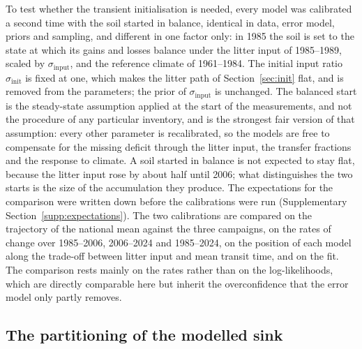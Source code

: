 \documentclass[11pt]{article}
\newcommand{\sinput}{\sigma_{\mathrm{input}}}
\newcommand{\sinit}{\sigma_{\mathrm{init}}}
\begin{document}
To test whether the transient initialisation is needed, every model was calibrated a second time
with the soil started in balance, identical in data, error model, priors and sampling, and
different in one factor only: in 1985 the soil is set to the state at which its gains and losses
balance under the litter input of 1985--1989, scaled by $\sinput$, and the reference climate of
1961--1984. The initial input ratio $\sinit$ is fixed at one, which makes the litter path of
Section~\ref{sec:init} flat, and is removed from the parameters; the prior of $\sinput$ is
unchanged. The balanced start is the steady-state assumption applied at the start of the
measurements, and not the procedure of any particular inventory, and is the strongest fair version
of that assumption: every other parameter is recalibrated, so the models are free to compensate for
the missing deficit through the litter input, the transfer fractions and the response to climate.
A soil started in balance is not expected to stay flat, because the litter input rose by about
half until 2006; what distinguishes the two starts is the size of the accumulation they produce.
The expectations for the comparison were written down before the calibrations were run
(Supplementary Section~\ref{supp:expectations}).
The two calibrations are compared on the trajectory of the national mean against the three
campaigns, on the rates of change over 1985--2006, 2006--2024 and 1985--2024, on the position of
each model along the trade-off between litter input and mean transit time, and on the fit. The
comparison rests mainly on the rates rather than on the log-likelihoods, which are directly
comparable here but inherit the overconfidence that the error model only partly removes.


\subsection{The partitioning of the modelled sink}\label{sec:division}
\end{document}
